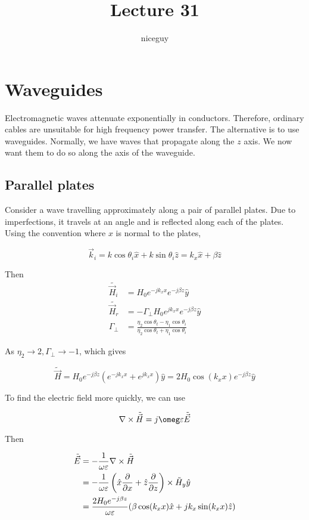 \documentclass[12pt]{article}
\title{Lecture 31}
\author{niceguy}
\begin{document}
\maketitle

\section{Waveguides}

Electromagnetic waves attenuate exponentially in conductors. Therefore, ordinary cables are unsuitable for high frequency power transfer. The alternative is to use waveguides. Normally, we have waves that propagate along the $z$ axis. We now want them to do so along the axis of the waveguide.

\subsection{Parallel plates}

Consider a wave travelling approximately along a pair of parallel plates. Due to imperfections, it travels at an angle and is reflected along each of the plates. Using the convention where $x$ is normal to the plates,

$$\vec k_i = k\cos\theta_i\hat x + k\sin\theta_i\hat z = k_x\hat x + \beta\hat z$$

Then
\begin{align*}
    \tilde{\vec H_i} &= H_0e^{-jk_xx}e^{-j\beta z}\hat y \\
    \tilde{\vec H_r} &= -\Gamma_\perp H_0e^{jk_xx}e^{-j\beta z}\hat y \\
    \Gamma_\perp &= \frac{\eta_2\cos\theta_t - \eta_1\cos\theta_i}{\eta_2\cos\theta_t + \eta_1\cos\theta_i}
\end{align*}

As $\eta_2 \rightarrow 2, \Gamma_\perp \rightarrow -1$, which gives

$$\tilde{\vec H} = H_0e^{-j\beta z}\left(e^{-jk_xx} + e^{jk_xx}\right)\hat y = 2H_0\cos(k_xx)e^{-j\beta z}\hat y$$

To find the electric field more quickly, we can use

$$\nabla \times \tilde{\vec H} = j\omeg\varepsilon \tilde{\vec E}$$

Then

\begin{align*}
    \tilde{\vec E} &= -\frac{1}{\omega\varepsilon} \nabla \times \tilde{\vec H} \\
                   &= -\frac{1}{\omega\varepsilon} \left(\hat x\frac{\partial }{\partial x} + \hat z\frac{\partial }{\partial z}\right) \times \tilde H_y \hat y \\
                   &= \frac{2H_0e^{-j\beta z}}{\omega\varepsilon}(\beta\cos(k_xx)\hat x + jk_x\sin(k_xx)\hat z)
\end{align*}
\end{document}
